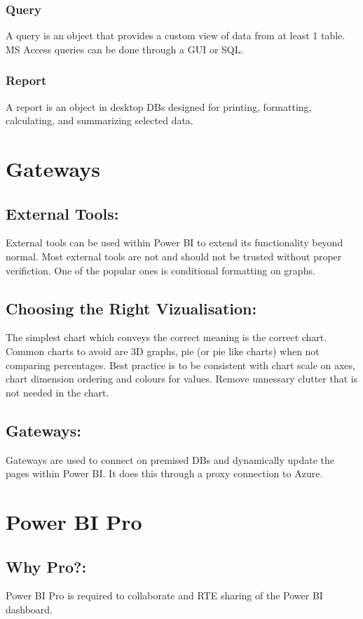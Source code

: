 \documentclass[a5paper]{article}
\begin{document}
	\subsubsection{Query}
	A query is an object that provides a custom view of data from at least 1 table. MS Access queries can be done through a GUI or SQL.
	\subsubsection{Report}
	A report is an object in desktop DBs designed for printing, formatting, calculating, and summarizing selected data.

	\section{Gateways}
	\subsection{External Tools:}
	External tools can be used within Power BI to extend its functionality beyond normal. Most external tools are not and should not be trusted without proper verifiction. One of the popular ones is conditional formatting on graphs.
	\subsection{Choosing the Right Vizualisation:}
	The simplest chart which conveys the correct meaning is the correct chart. Common charts to avoid are 3D graphs, pie (or pie like charts) when not comparing percentages. Best practice is to be consistent with chart scale on axes, chart dimension ordering and colours for values. Remove unnessary clutter that is not needed in the chart.
	\subsection{Gateways:}
	Gateways are used to connect on premised DBs and dynamically update the pages within Power BI. It does this through a proxy connection to Azure.

	\section{Power BI Pro}
	\subsection{Why Pro?:}
	Power BI Pro is required to collaborate and RTE sharing of the Power BI dashboard.
\end{document}
